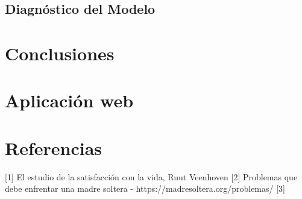 \documentclass[11pt,twoside]{article}
\begin{document}
\subsection{Diagnóstico del Modelo}








\section{Conclusiones}







\section{Aplicación web}






\section{Referencias}
[1] El estudio de la satisfacción con la vida, Ruut Veenhoven 
[2] Problemas que debe enfrentar una madre soltera - https://madresoltera.org/problemas/
[3] 
\end{document}
